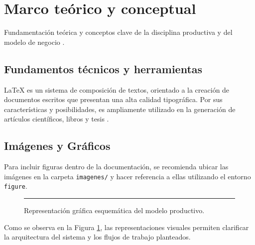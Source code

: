 \section{Marco teórico y conceptual}
\label{sec:marco_teorico}

Fundamentación teórica y conceptos clave de la disciplina productiva y del modelo de negocio \parencite{osterwalder2010generacion, kotler2016direccion}.

\subsection{Fundamentos técnicos y herramientas}
\LaTeX{} es un sistema de composición de textos, orientado a la creación de documentos escritos que presentan una alta calidad tipográfica. Por sus características y posibilidades, es ampliamente utilizado en la generación de artículos científicos, libros y tesis \parencite{latexproject}.

\subsection{Imágenes y Gráficos}
Para incluir figuras dentro de la documentación, se recomienda ubicar las imágenes en la carpeta \texttt{imagenes/} y hacer referencia a ellas utilizando el entorno \texttt{figure}.

\begin{figure}[htbp]
    \centering
    \rule{0.6\textwidth}{4cm} %
    \caption{Representación gráfica esquemática del modelo productivo.}
    \label{fig:esquema_ejemplo}
\end{figure}

Como se observa en la Figura \ref{fig:esquema_ejemplo}, las representaciones visuales permiten clarificar la arquitectura del sistema y los flujos de trabajo planteados.
